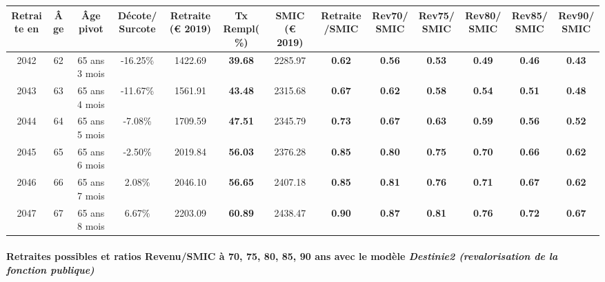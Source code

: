 { \scriptsize \begin{center} 
\begin{tabular}[htb]{|c|c||c|c||c|c||c||c|c|c|c|c|c|} 
\hline 
 Retraite en &  Âge &  Âge pivot &  Décote/Surcote &  Retraite (\euro{} 2019) &  Tx Rempl(\%) &  SMIC (\euro{} 2019) &  Retraite/SMIC &  Rev70/SMIC &  Rev75/SMIC &  Rev80/SMIC &  Rev85/SMIC &  Rev90/SMIC \\ 
\hline \hline 
 2042 &  62 &  65 ans 3 mois &  -16.25\% &  1422.69 &  {\bf 39.68} &  2285.97 &  {\bf {\color{red} 0.62}} &  {\bf {\color{red} 0.56}} &  {\bf {\color{red} 0.53}} &  {\bf {\color{red} 0.49}} &  {\bf {\color{red} 0.46}} &  {\bf {\color{red} 0.43}} \\ 
\hline 
 2043 &  63 &  65 ans 4 mois &  -11.67\% &  1561.91 &  {\bf 43.48} &  2315.68 &  {\bf {\color{red} 0.67}} &  {\bf {\color{red} 0.62}} &  {\bf {\color{red} 0.58}} &  {\bf {\color{red} 0.54}} &  {\bf {\color{red} 0.51}} &  {\bf {\color{red} 0.48}} \\ 
\hline 
 2044 &  64 &  65 ans 5 mois &  -7.08\% &  1709.59 &  {\bf 47.51} &  2345.79 &  {\bf {\color{red} 0.73}} &  {\bf {\color{red} 0.67}} &  {\bf {\color{red} 0.63}} &  {\bf {\color{red} 0.59}} &  {\bf {\color{red} 0.56}} &  {\bf {\color{red} 0.52}} \\ 
\hline 
 2045 &  65 &  65 ans 6 mois &  -2.50\% &  2019.84 &  {\bf 56.03} &  2376.28 &  {\bf {\color{red} 0.85}} &  {\bf {\color{red} 0.80}} &  {\bf {\color{red} 0.75}} &  {\bf {\color{red} 0.70}} &  {\bf {\color{red} 0.66}} &  {\bf {\color{red} 0.62}} \\ 
\hline 
 2046 &  66 &  65 ans 7 mois &  2.08\% &  2046.10 &  {\bf 56.65} &  2407.18 &  {\bf {\color{red} 0.85}} &  {\bf {\color{red} 0.81}} &  {\bf {\color{red} 0.76}} &  {\bf {\color{red} 0.71}} &  {\bf {\color{red} 0.67}} &  {\bf {\color{red} 0.62}} \\ 
\hline 
 2047 &  67 &  65 ans 8 mois &  6.67\% &  2203.09 &  {\bf 60.89} &  2438.47 &  {\bf {\color{red} 0.90}} &  {\bf {\color{red} 0.87}} &  {\bf {\color{red} 0.81}} &  {\bf {\color{red} 0.76}} &  {\bf {\color{red} 0.72}} &  {\bf {\color{red} 0.67}} \\ 
\hline 
\hline 
\end{tabular} 
\end{center} } 
\paragraph{Retraites possibles et ratios Revenu/SMIC à 70, 75, 80, 85, 90 ans avec le modèle \emph{Destinie2 (revalorisation de la fonction publique)}}  
 
